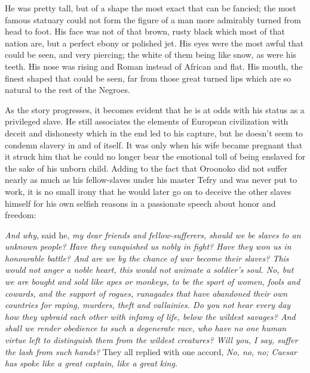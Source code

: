 \begin{displayquote}
He was pretty tall, but of a shape the most exact that can be fancied; the most 
famous statuary could not form the figure of a man more admirably turned from 
head to foot. His face was not of that brown, rusty black which most of that 
nation are, but a perfect ebony or polished jet. His eyes were the most awful 
that could be seen, and very piercing; the white of them being like snow, as 
were his teeth. His nose was rising and Roman instead of African and flat. 
His mouth, the finest shaped that could be seen, far from those great turned 
lips which are so natural to the rest of the 
Negroes. \autocite[18]{behn2003}
\end{displayquote}

As the story progresses, it becomes evident that he is at odds with his status 
as a privileged slave. He still associates the elements of European civilization 
with deceit and dishonesty which in the end led to his capture, but he doesn’t 
seem to condemn slavery in and of itself. It was only when his wife became 
pregnant that it struck him that he could no longer bear the emotional toll of 
being enslaved for the sake of his unborn child. Adding to the fact that 
Oroonoko did not suffer nearly as much as his fellow-slaves under his master 
Tefry and was never put to work, it is no small irony that he would later go on 
to deceive the other slaves himself for his own selfish reasons in a passionate 
speech about honor and freedom:

\begin{displayquote}
\emph{And why}, said he, \emph{my dear friends and fellow-sufferers, should we 
be slaves to an unknown people? Have they vanquished us nobly in fight? Have 
they won us in honourable battle? And are we by the chance of war become their 
slaves? This would not anger a noble heart, this would not animate a soldier’s 
soul. No, but we are bought and sold like apes or monkeys, to be the sport of 
women, fools and cowards, and the support of rogues, runagades that have 
abandoned their own countries for raping, murders, theft and vallainies. Do you 
not hear every day how they upbraid each other with infamy of life, below the 
wildest savages? And shall we render obedience to such a degenerate race, who 
have no one human virtue left to distinguish them from the wildest creatures? 
Will you, I say, suffer the lash from such hands?} They all replied with one 
accord, \emph{No, no, no; Caesar has spoke like a great captain, like a great 
king.} \autocite[89-90]{behn2003}
\end{displayquote}


